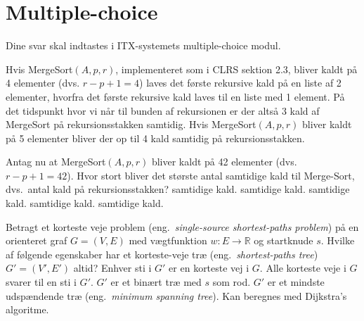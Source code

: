 \section*{Multiple-choice}\label{sec:mc}

Dine svar skal indtastes i ITX-systemets multiple-choice modul.

\multiplechoicestart

Hvis {\sc MergeSort}$(A,p,r)$, implementeret som i CLRS sektion 2.3, 
bliver kaldt på 4 elementer (dvs. $r-p+1 = 4$) laves det første rekursive kald på en liste af 2 elementer, hvorfra det første rekursive kald laves til en liste med 1 element. På det tidspunkt hvor vi når til bunden af rekursionen er der altså 3 kald af {\sc MergeSort} på rekursionsstakken samtidig.
Hvis {\sc MergeSort}$(A,p,r)$ bliver kaldt på 5 elementer bliver der op til 4 kald samtidig på rekursionsstakken.

\medskip

Antag nu at {\sc MergeSort}$(A,p,r)$ bliver kaldt på 42 elementer (dvs. $r-p+1 = 42$).
Hvor stort bliver det største antal samtidige kald til {\sc Merge-Sort}, dvs.~antal kald på rekursionsstakken?
\etsvar
\mulighederstart
{} samtidige kald.
 samtidige kald.
 samtidige kald.
 samtidige kald.
 samtidige kald. \korrekt
\mulighederslut
{}


Betragt et korteste veje problem (eng.~\emph{single-source shortest-paths problem}) på en orienteret graf $G=(V,E)$ med vægtfunktion $w: E\rightarrow \mathbb{R}$ og startknude $s$.
Hvilke af følgende egenskaber har et korteste-veje træ (eng.~\emph{shortest-paths tree}) $G'=(V',E')$ altid?
\fleresvar
\mulighederstart
\svar Enhver sti i $G'$ er en korteste vej i $G$. \korrekt
\svar Alle korteste veje i $G$ svarer til en sti i $G'$.
\svar $G'$ er et binært træ med $s$ som rod.
\svar $G'$ er et mindste udspændende træ (eng.~\emph{minimum spanning tree}).
\svar Kan beregnes med Dijkstra's algoritme.
\mulighederslut
{}


